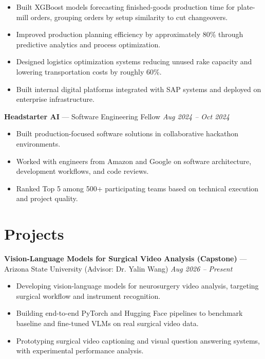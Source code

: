 \documentclass[a4paper,8pt]{extarticle}
\begin{document}
\begin{itemize}
\item Built XGBoost models forecasting finished-goods production time for plate-mill orders, grouping orders by setup similarity to cut changeovers.
\item Improved production planning efficiency by approximately 80\% through predictive analytics and process optimization.
\item Designed logistics optimization systems reducing unused rake capacity and lowering transportation costs by roughly 60\%.
\item Built internal digital platforms integrated with SAP systems and deployed on enterprise infrastructure.
\end{itemize}

\noindent
\textbf{Headstarter AI} --- Software Engineering Fellow
\hfill \textit{Aug 2024 -- Oct 2024}

\begin{itemize}
\item Built production-focused software solutions in collaborative hackathon environments.
\item Worked with engineers from Amazon and Google on software architecture, development workflows, and code reviews.
\item Ranked Top 5 among 500+ participating teams based on technical execution and project quality.
\end{itemize}

\section*{Projects}

\noindent
\textbf{Vision-Language Models for Surgical Video Analysis (Capstone)} --- Arizona State University (Advisor: Dr. Yalin Wang)
\hfill \textit{Aug 2026 -- Present}

\begin{itemize}
\item Developing vision-language models for neurosurgery video analysis, targeting surgical workflow and instrument recognition.
\item Building end-to-end PyTorch and Hugging Face pipelines to benchmark baseline and fine-tuned VLMs on real surgical video data.
\item Prototyping surgical video captioning and visual question answering systems, with experimental performance analysis.
\end{itemize}
\end{document}
